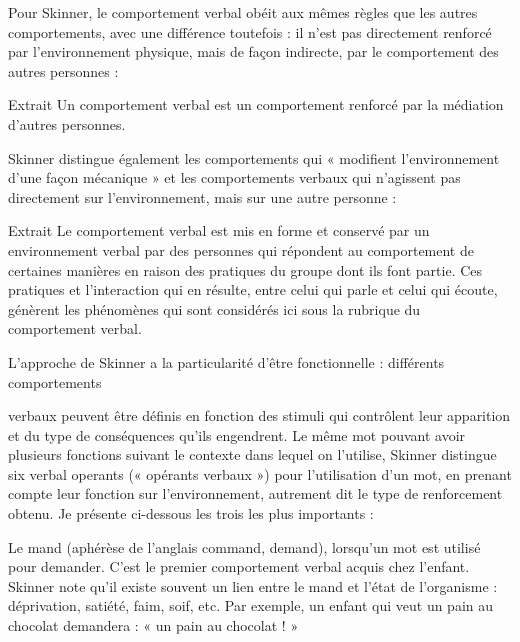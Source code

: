
Pour Skinner, le comportement verbal obéit aux mêmes règles que les autres comportements, avec une différence toutefois : il n’est pas directement renforcé par l’environnement physique, mais de façon indirecte, par le comportement des autres personnes :\par

\begin{lecture}{Extrait}
Un comportement verbal est un comportement renforcé par la médiation d’autres personnes.
\end{lecture}

Skinner distingue également les comportements qui « modifient l’environnement d’une façon mécanique » et les comportements verbaux qui n’agissent pas directement sur l’environnement, mais sur une autre personne :\par

\begin{lecture}{Extrait}
Le comportement verbal est mis en forme et conservé par un environnement verbal par des personnes qui répondent au comportement de certaines manières en raison des pratiques du groupe dont ils font partie. Ces pratiques et l'interaction qui en résulte, entre celui qui parle et celui qui écoute, génèrent les phénomènes qui sont considérés ici sous la rubrique du comportement verbal.
\end{lecture}


L'approche de Skinner a la particularité d’être fonctionnelle : différents comportements\par


verbaux peuvent être définis en fonction des stimuli qui contrôlent leur apparition et du type de conséquences qu’ils engendrent. Le même mot pouvant avoir plusieurs fonctions suivant le contexte dans lequel on l’utilise, Skinner distingue six verbal operants (« opérants verbaux ») pour l’utilisation d’un mot, en prenant compte leur fonction sur l’environnement, autrement dit le type de renforcement obtenu. Je présente ci-dessous les trois les plus importants :\par

Le mand (aphérèse de l’anglais command, demand), lorsqu’un mot est utilisé pour demander. C’est le premier comportement verbal acquis chez l’enfant. Skinner note qu’il existe souvent un lien entre le mand et l’état de l’organisme : déprivation, satiété, faim, soif, etc. Par exemple, un enfant qui veut un pain au chocolat demandera : « un pain au chocolat ! »\par

